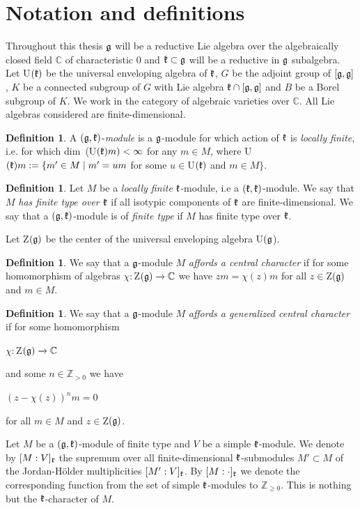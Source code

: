 \documentclass[12pt]{amsart}
\theoremstyle{definition}\newtheorem{theorem}{Theorem}[section]
\theoremstyle{definition}\newtheorem{definition}[proposition]{Definition}
\theoremstyle{remark}\newtheorem{example}[proposition]{Example}
\renewcommand{\to}[1][]{\xrightarrow{#1}}
\begin{document}
\section{Notation and definitions}\label{Snot}
Throughout this thesis $\frak g$ will be a reductive Lie algebra
over the algebraically closed field $\mathbb C$ of characteristic 0
and $\frak k\subset\frak g$ will be a reductive in $\frak g$
subalgebra. Let U$(\frak k)$ be the universal enveloping algebra of
$\frak k$, $G$ be the adjoint group of $[\frak g, \frak g]$, $K$ be
a connected subgroup of $G$ with Lie algebra $\frak k\cap [\frak g,
\frak g]$ and $B$ be a Borel subgroup of $K$. We work in the
category of algebraic varieties over $\mathbb C$. All Lie algebras
considered are finite-dimensional.
\begin{definition}\label{Dgk}A $(\frak g, \frak k)$-{\it module} is a $\frak g$-module for which action of $\frak k$ is {\it locally finite}, i.e. for which dim~(U$(\frak k)m)<\infty$ for any $m\in M$, where U$(\frak k)m:=\{m'\in M\mid m'=um$ for some $u\in$U$(\frak k)$ and $m\in M\}$.\end{definition}
\begin{definition}Let $M$ be a {\it locally finite} $\frak k$-module, i.e a $(\frak k, \frak k)$-module. We say that $M$ {\it has finite type over $\frak k$} if all isotypic components of $\frak k$ are finite-dimensional. We say that a $(\frak g, \frak k)$-module is of {\it finite type} if $M$ has finite type over $\frak k$.\end{definition}
Let Z$(\frak g)$ be the center of the universal enveloping algebra U$(\frak g$).
\begin{definition} We say that a $\frak g$-module $M$ {\it affords a central character} if for some homomorphism of algebras $\chi:$Z$(\frak g)\to\mathbb C$ we have $zm=\chi(z)m$  for all $z\in$Z$(\frak g)$ and $m\in M$.\end{definition}
\begin{definition} We say that a $\frak g$-module $M$ {\it affords a generalized central character} if for some homomorphism \begin{center}$\chi:$Z$(\frak g)\to\mathbb C$\end{center} and some $n\in\mathbb Z_{>0}$ we have \begin{center}$(z-\chi(z))^nm=0$\end{center} for all $m\in M$ and $z\in$Z$(\frak g)$.\end{definition}
Let $M$ be a $(\frak g, \frak k)$-module of finite type and $V$ be a simple $\frak k$-module. We denote by $[M: V]_\frak k$ the supremum over all finite-dimensional $\frak k$-submodules $M'\subset M$ of the Jordan-H\"older multiplicities $[M': V]_\frak k$. By $[M: \cdot]_\frak k$  we denote the corresponding function from the set of simple $\frak k$-modules to $\mathbb Z_{\ge0}$. This is nothing but the $\frak k$-character of $M$.
\end{document}
